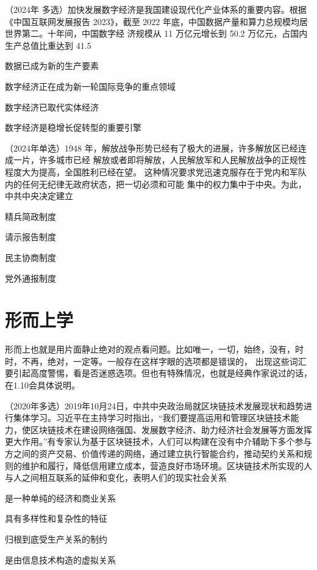 \documentclass[lang=cn,blue,10pt,scheme=chinese,twocol]{zznote}
\begin{document}
\begin{example}
	（2024年 多选）加快发展数字经济是我国建设现代化产业体系的重要内容。根据《中国互联网发展报告 2023》，截至 2022 年底，中国数据产量和算力总规模均居世界第二。十年间，中国数字经 济规模从 11 万亿元增长到 50.2 万亿元，占国内生产总值比重达到 41.5%
	\begin{choice}
		\item 数据已成为新的生产要素
		\item 数字经济正在成为新一轮国际竞争的重点领域
		\item 数字经济已取代实体经济
		\item 数字经济是稳增长促转型的重要引擎
	\end{choice}
\end{example}




\begin{example}
	（2024年单选）1948 年，解放战争形势已经有了极大的进展，许多解放区已经连成一片，许多城市已经 解放或者即将解放，人民解放军和人民解放战争的正规性程度大为提高，全国胜利已经在望。 这种情况要求党迅速克服存在于党内和军队内的任何无纪律无政府状态，把一切必须和可能 集中的权力集中于中央。为此，中共中央决定建立
	\begin{choice}
		\item 精兵简政制度
		\item 请示报告制度
		\item 民主协商制度
		\item 党外通报制度
	\end{choice}
\end{example}

\section{形而上学}
\begin{definition}
	形而上也就是用片面静止绝对的观点看问题。比如唯一，一切，始终，没有，时时，不再，绝对，一定等。一般存在这样字眼的选项都是错误的，
	出现这些词汇要引起高度警惕，看是否迷惑选项。但也有特殊情况，也就是经典作家说过的话，在1.10会具体说明。
\end{definition}


\begin{example} （2020年多选）2019年10月24日，中共中央政治局就区块链技术发展现状和趋势进行集体学习。习近平在主持学习时指出，“我们要提高运用和管理区块链技术能力，使区块链技术在建设网络强国、发展数字经济、助力经济社会发展等方面发挥更大作用。”有专家认为基于区块链技术，人们可以构建在没有中介辅助下多个参与方之间的资产交易、价值传递的网络，通过建立执行智能合约，推动契约关系和规则的维护和履行，降低信用建立成本，营造良好市场环境。区块链技术所实现的人与人之间相互联系的延伸和变化，表明人们的现实社会关系
	\begin{choice}
		\item 是一种单纯的经济和商业关系
		\item 具有多样性和复杂性的特征
		\item 归根到底受生产关系的制约
		\item 是由信息技术构造的虚拟关系
	\end{choice}
\end{example}
\end{document}
